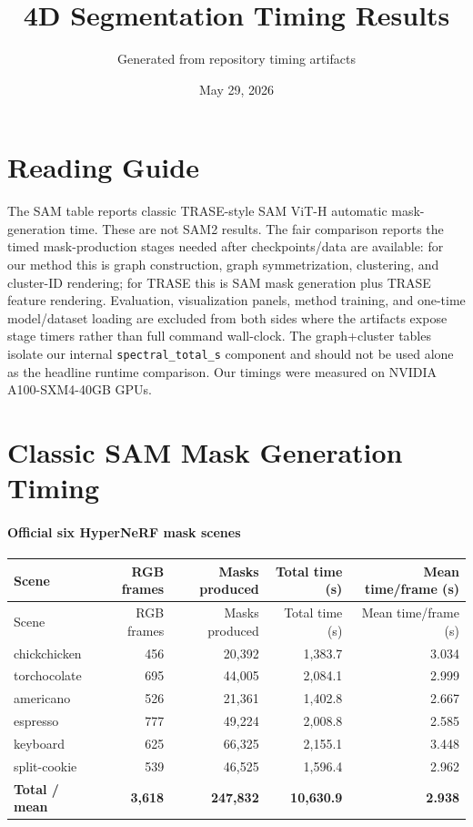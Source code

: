 \documentclass[10pt]{article}
\begin{document}
\title{4D Segmentation Timing Results}
\author{Generated from repository timing artifacts}
\date{May 29, 2026}
\maketitle

\section{Reading Guide}
The SAM table reports classic TRASE-style SAM ViT-H automatic mask-generation time.  These are not SAM2 results.  The fair comparison reports the timed mask-production stages needed after checkpoints/data are available: for our method this is graph construction, graph symmetrization, clustering, and cluster-ID rendering; for TRASE this is SAM mask generation plus TRASE feature rendering.  Evaluation, visualization panels, method training, and one-time model/dataset loading are excluded from both sides where the artifacts expose stage timers rather than full command wall-clock.  The graph+cluster tables isolate our internal \texttt{spectral\_total\_s} component and should not be used alone as the headline runtime comparison.  Our timings were measured on NVIDIA A100-SXM4-40GB GPUs.

\section{Classic SAM Mask Generation Timing}
\paragraph{Official six HyperNeRF mask scenes}
\small
\begin{longtable}{lrrrr}
\toprule
Scene & RGB frames & Masks produced & Total time (s) & Mean time/frame (s) \\
\midrule
\endfirsthead
\toprule
Scene & RGB frames & Masks produced & Total time (s) & Mean time/frame (s) \\
\midrule
\endhead
chickchicken & 456 & 20,392 & 1,383.7 & 3.034 \\
torchocolate & 695 & 44,005 & 2,084.1 & 2.999 \\
americano & 526 & 21,361 & 1,402.8 & 2.667 \\
espresso & 777 & 49,224 & 2,008.8 & 2.585 \\
keyboard & 625 & 66,325 & 2,155.1 & 3.448 \\
split-cookie & 539 & 46,525 & 1,596.4 & 2.962 \\
\midrule
\textbf{Total / mean} & \textbf{3,618} & \textbf{247,832} & \textbf{10,630.9} & \textbf{2.938} \\
\bottomrule
\end{longtable}
\normalsize
\end{document}
